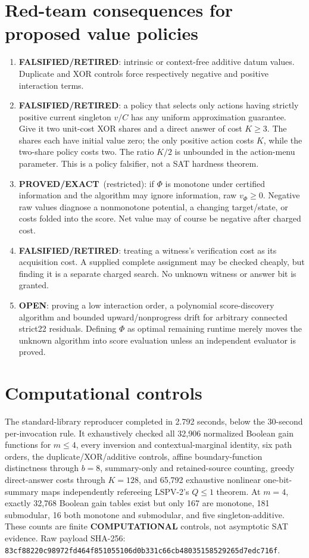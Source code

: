 \documentclass[11pt]{article}
\newcommand{\PROVED}{\textbf{PROVED/EXACT}}
\newcommand{\OPEN}{\textbf{OPEN}}
\newcommand{\FALSIFIED}{\textbf{FALSIFIED/RETIRED}}
\begin{document}
\section{Red-team consequences for proposed value policies}
\begin{enumerate}
\item \FALSIFIED: intrinsic or context-free additive datum values.  Duplicate
and XOR controls force respectively negative and positive interaction terms.
\item \FALSIFIED: a policy that selects only actions having strictly positive
current singleton $v/C$ has any uniform approximation guarantee.  Give it two
unit-cost XOR shares and a direct answer of cost $K\ge3$.  The shares each have
initial value zero; the only positive action costs $K$, while the two-share
policy costs two.  The ratio $K/2$ is unbounded in the action-menu parameter.
This is a policy falsifier, not a SAT hardness theorem.
\item \PROVED\ (restricted): if $\Phi$ is monotone under certified information
and the algorithm may ignore information, raw $v_\Phi\ge0$.  Negative raw
values diagnose a nonmonotone potential, a changing target/state, or costs
folded into the score.  Net value may of course be negative after charged cost.
\item \FALSIFIED: treating a witness's verification cost as its acquisition
cost.  A supplied complete assignment may be checked cheaply, but finding it
is a separate charged search.  No unknown witness or answer bit is granted.
\item \OPEN: proving a low interaction order, a polynomial score-discovery
algorithm and bounded upward/nonprogress drift for arbitrary connected
strict22 residuals.  Defining $\Phi$ as optimal remaining runtime merely moves
the unknown algorithm into score evaluation unless an independent evaluator is
proved.
\end{enumerate}

\section{Computational controls}
The standard-library reproducer completed in 2.792 seconds, below the
30-second per-invocation rule.  It exhaustively checked all 32,906 normalized
Boolean gain functions for $m\le4$, every inversion and contextual-marginal
identity, six path orders, the duplicate/XOR/additive controls, affine
boundary-function distinctness through $b=8$, summary-only and retained-source
counting, greedy direct-answer costs through $K=128$, and 65,792 exhaustive
nonlinear one-bit-summary maps independently refereeing LSPV-2's $Q\le1$
theorem.  At $m=4$, exactly
32,768 Boolean gain tables exist but only 167 are monotone, 181 submodular,
16 both monotone and submodular, and five singleton-additive.  These counts are
finite \textbf{COMPUTATIONAL} controls, not asymptotic SAT evidence.  Raw
payload SHA-256:
\texttt{83cf88220c98972fd464f851055106d0b331c66cb48035158529265d7edc716f}.
\end{document}
